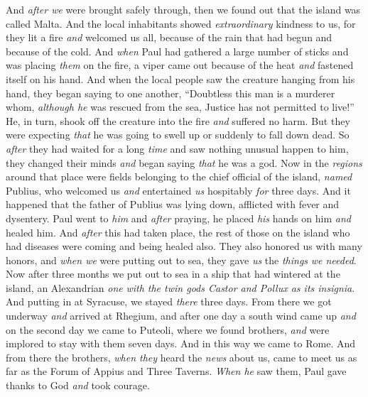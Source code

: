 \begin{biblechapter} %
 And \textit{after we} were brought safely through, then we found out that the island was called Malta.
\verse And the local inhabitants showed \textit{extraordinary} kindness to us, for they lit a fire \textit{and} welcomed us all, because of the rain that had begun and because of the cold.
\verse And \textit{when} Paul had gathered a large number of sticks and was placing \textit{them} on the fire, a viper came out because of the heat \textit{and} fastened itself on his hand.
\verse And when the local people saw the creature hanging from his hand, they began saying to one another, “Doubtless this man is a murderer whom, \textit{although he} was rescued from the sea, Justice has not permitted to live!”
\verse He, in turn, shook off the creature into the fire \textit{and} suffered no harm.
\verse But they were expecting \textit{that} he was going to swell up or suddenly to fall down dead. So \textit{after} they had waited for a long \textit{time} and saw nothing unusual happen to him, they changed their minds \textit{and} began saying \textit{that} he was a god.
\verse Now in the \textit{regions} around that place were fields belonging to the chief official of the island, \textit{named} Publius, who welcomed us \textit{and} entertained \textit{us} hospitably \textit{for} three days.
\verse And it happened that the father of Publius was lying down, afflicted with fever and dysentery. Paul went to \textit{him} and \textit{after} praying, he placed \textit{his} hands on him \textit{and} healed him.
\verse And \textit{after} this had taken place, the rest of those on the island who had diseases were coming and being healed also.
\verse They also honored us with many honors, and \textit{when we} were putting out to sea, they gave \textit{us} the \textit{things} \textit{we needed}.
 Now after three months we put out to sea in a ship that had wintered at the island, an Alexandrian \textit{one} \textit{with the twin gods Castor and Pollux as its insignia}.
\verse And putting in at Syracuse, we stayed \textit{there} three days.
\verse From there we got underway \textit{and} arrived at Rhegium, and after one day a south wind came up \textit{and} on the second day we came to Puteoli,
\verse where we found brothers, \textit{and} were implored to stay with them seven days. And in this way we came to Rome.
\verse And from there the brothers, \textit{when they} heard the \textit{news} about us, came to meet us as far as the Forum of Appius and Three Taverns. \textit{When he} saw them, Paul gave thanks to God \textit{and} took courage.

\end{biblechapter}
